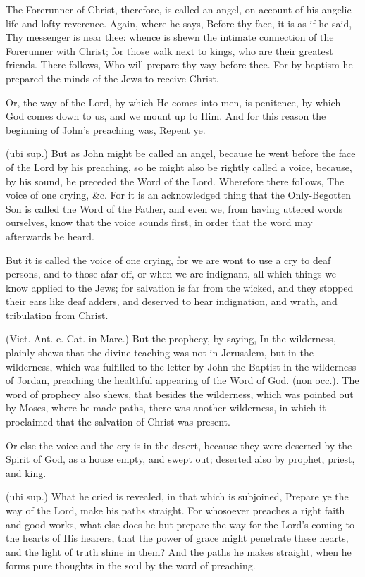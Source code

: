  The Forerunner of Christ, therefore, is called an angel, on account of his angelic life and lofty reverence. Again, where he says, Before thy face, it is as if he said, Thy messenger is near thee: whence is shewn the intimate connection of the Forerunner with Christ; for those walk next to kings, who are their greatest friends. There follows, Who will prepare thy way before thee. For by baptism he prepared the minds of the Jews to receive Christ.

 Or, the way of the Lord, by which He comes into men, is penitence, by which God comes down to us, and we mount up to Him. And for this reason the beginning of John’s preaching was, Repent ye.

 (ubi sup.) But as John might be called an angel, because he went before the face of the Lord by his preaching, so he might also be rightly called a voice, because, by his sound, he preceded the Word of the Lord. Wherefore there follows, The voice of one crying, \&c. For it is an acknowledged thing that the Only-Begotten Son is called the Word of the Father, and even we, from having uttered words ourselves, know that the voice sounds first, in order that the word may afterwards be heard.

 But it is called the voice of one crying, for we are wont to use a cry to deaf persons, and to those afar off, or when we are indignant, all which things we know applied to the Jews; for salvation is far from the wicked, and they stopped their ears like deaf adders, and deserved to hear indignation, and wrath, and tribulation from Christ.

 (Vict. Ant. e. Cat. in Marc.) But the prophecy, by saying, In the wilderness, plainly shews that the divine teaching was not in Jerusalem, but in the wilderness, which was fulfilled to the letter by John the Baptist in the wilderness of Jordan, preaching the healthful appearing of the Word of God. (non occ.). The word of prophecy also shews, that besides the wilderness, which was pointed out by Moses, where he made paths, there was another wilderness, in which it proclaimed that the salvation of Christ was present.

 Or else the voice and the cry is in the desert, because they were deserted by the Spirit of God, as a house empty, and swept out; deserted also by prophet, priest, and king.

 (ubi sup.) What he cried is revealed, in that which is subjoined, Prepare ye the way of the Lord, make his paths straight. For whosoever preaches a right faith and good works, what else does he but prepare the way for the Lord’s coming to the hearts of His hearers, that the power of grace might penetrate these hearts, and the light of truth shine in them? And the paths he makes straight, when he forms pure thoughts in the soul by the word of preaching.


